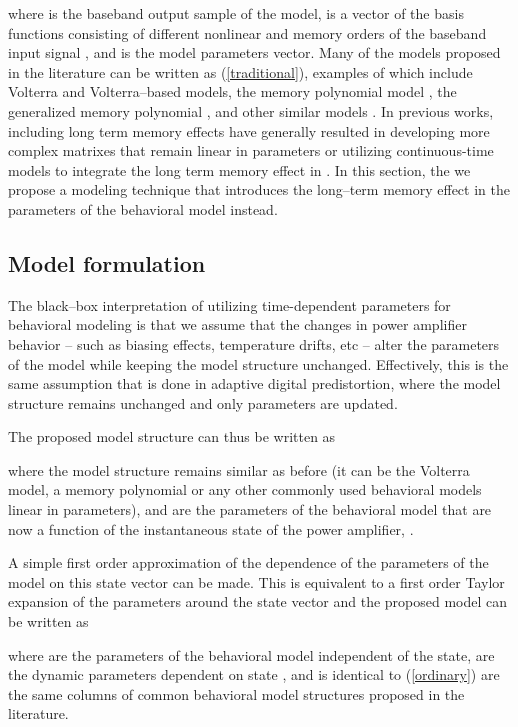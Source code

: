 \documentclass[journal]{IEEEtran}
\begin{document}
where  is the baseband output sample of the model,  is a vector of the basis functions consisting of different nonlinear and memory orders of the baseband input signal , and  is the model parameters vector. Many of the models proposed in the literature can be written as (\ref{traditional}), examples of which include Volterra and Volterra--based models, the memory polynomial model \cite{kim}, the generalized memory polynomial \cite{morgan}, and other similar models \cite{pedro}. In previous works, including long term memory effects have generally resulted in developing more complex  matrixes that remain linear in parameters \cite{crespo2010} or utilizing continuous-time models to integrate the long term memory effect in  \cite{ngoya}. In this section, the we propose a modeling technique that introduces the long--term memory effect in the parameters of the behavioral model  instead.

\subsection{Model formulation}
The black--box interpretation of utilizing time-dependent parameters for behavioral modeling is that we assume that the changes in power amplifier behavior -- such as biasing effects, temperature drifts, etc -- alter the parameters of the model while keeping the model structure unchanged. Effectively, this is the same assumption that is done in adaptive digital predistortion, where the model structure remains unchanged and only parameters are updated.

The proposed model structure can thus be written as

where the model structure remains similar as before (it can be the Volterra model, a memory polynomial or any other commonly used behavioral models linear in parameters), and  are the parameters of the behavioral model that are now a function of the instantaneous state of the power amplifier, .

A simple first order approximation of the dependence of the parameters of the model on this state vector  can be made. This is equivalent to a first order Taylor expansion of the parameters  around the state vector  and the proposed model can be written as

where  are the parameters of the behavioral model independent of the state,  are the dynamic parameters dependent on state , and  is identical to (\ref{ordinary}) are the same columns of common behavioral model structures proposed in the literature.
\end{document}
